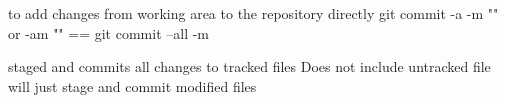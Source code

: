to add changes from working area to the repository directly 
  git commit -a -m "" or -am ""    ==    git commit --all -m 

  staged and commits all changes to tracked files 
  Does not include untracked file 
  will just stage and commit modified files 